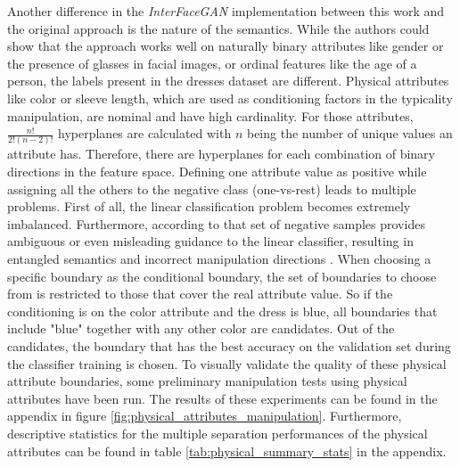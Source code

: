Another difference in the \textit{InterFaceGAN} implementation between this work and the original approach is the nature of the semantics. While the authors could show that the approach works well on naturally binary attributes like gender or the presence of glasses in facial images, or ordinal features like the age of a person, the labels present in the dresses dataset are different. Physical attributes like color or sleeve length, which are used as conditioning factors in the typicality manipulation, are nominal and have high cardinality. For those attributes, $\frac{n!}{2!(n-2)!}$ hyperplanes are calculated with $n$ being the number of unique values an attribute has. Therefore, there are hyperplanes for each combination of binary directions in the feature space. Defining one attribute value as positive while assigning all the others to the negative class (one-vs-rest) leads to multiple problems. First of all, the linear classification problem becomes extremely imbalanced. Furthermore, according to \cite{yang2021discovering} that set of negative samples provides ambiguous or even misleading guidance to the linear classifier, resulting in entangled semantics and incorrect manipulation directions \citep[p.1]{yang2021discovering}. When choosing a specific boundary as the conditional boundary, the set of boundaries to choose from is restricted to those that cover the real attribute value. So if the conditioning is on the color attribute and the dress is blue, all boundaries that include "blue" together with any other color are candidates. Out of the candidates, the boundary that has the best accuracy on the validation set during the classifier training is chosen. To visually validate the quality of these physical attribute boundaries, some preliminary manipulation tests using physical attributes have been run. The results of these experiments can be found in the appendix in figure \ref{fig:physical_attributes_manipulation}. Furthermore, descriptive statistics for the multiple separation performances of the physical attributes can be found in table \ref{tab:physical_summary_stats} in the appendix.



